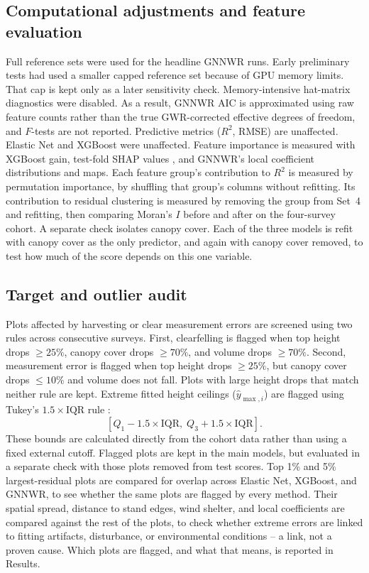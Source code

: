 \documentclass[logo,msc,ai]{infthesis}           %
\begin{document}
\subsection*{Computational adjustments and feature evaluation}
Full reference sets were used for the headline GNNWR runs. Early preliminary tests had used a smaller capped reference set because of GPU memory limits. That cap is kept only as a later sensitivity check. Memory-intensive hat-matrix diagnostics were disabled. As a result, GNNWR AIC is approximated using raw feature counts rather than the true GWR-corrected effective degrees of freedom, and $F$-tests are not reported. Predictive metrics ($R^2$, RMSE) are unaffected. Elastic Net and XGBoost were unaffected. Feature importance is measured with XGBoost gain, test-fold SHAP values \cite{lundberg2017Unified_C7_XAI}, and GNNWR's local coefficient distributions and maps. Each feature group's contribution to $R^2$ is measured by permutation importance, by shuffling that group's columns without refitting. Its contribution to residual clustering is measured by removing the group from Set~4 and refitting, then comparing Moran's $I$ before and after on the four-survey cohort. A separate check isolates canopy cover. Each of the three models is refit with canopy cover as the only predictor, and again with canopy cover removed, to test how much of the score depends on this one variable.

\subsection*{Target and outlier audit}
Plots affected by harvesting or clear measurement errors are screened using two rules across consecutive surveys. First, clearfelling is flagged when top height drops $\ge 25\%$, canopy cover drops $\ge 70\%$, and volume drops $\ge 70\%$. Second, measurement error is flagged when top height drops $\ge 25\%$, but canopy cover drops $\le 10\%$ and volume does not fall. Plots with large height drops that match neither rule are kept. Extreme fitted height ceilings ($\hat{y}_{\max,i}$) are flagged using Tukey's $1.5 \times \text{IQR}$ rule \cite{tukey1977Exploratory_C5_EVAL}:
\begin{equation}
\left[Q_1 - 1.5 \times \text{IQR},\; Q_3 + 1.5 \times \text{IQR}\right].
\label{eq:tukey-fences}
\end{equation}
These bounds are calculated directly from the cohort data rather than using a fixed external cutoff. Flagged plots are kept in the main models, but evaluated in a separate check with those plots removed from test scores. Top 1\% and 5\% largest-residual plots are compared for overlap across Elastic Net, XGBoost, and GNNWR, to see whether the same plots are flagged by every method. Their spatial spread, distance to stand edges, wind shelter, and local coefficients are compared against the rest of the plots, to check whether extreme errors are linked to fitting artifacts, disturbance, or environmental conditions -- a link, not a proven cause. Which plots are flagged, and what that means, is reported in Results.
\end{document}

